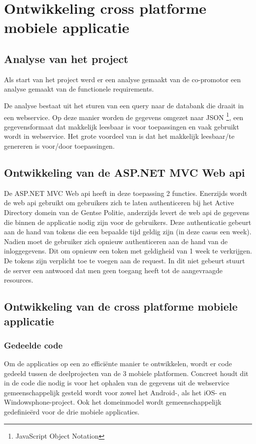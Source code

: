 \chapter{Ontwikkeling cross platforme mobiele applicatie}
\label{ch:ontwikkelingcrossplatformapp}
\section{Analyse van het project}
Als start van het project werd er een analyse gemaakt van de co-promotor
een analyse gemaakt van de functionele requirements.

De analyse bestaat uit het sturen van een query naar de databank die draait in een webservice.
Op deze manier worden de gegevens omgezet naar JSON \footnote{JavaScript Object Notation}, een gegevensformaat dat makkelijk
leesbaar is voor toepassingen en vaak gebruikt wordt in webservice.  Het grote voordeel van \cite{inleidingtotjson}
is dat het makkelijk leesbaar/te genereren is voor/door toepassingen.

\section{Ontwikkeling van de ASP.NET MVC Web api}
De ASP.NET MVC Web api heeft in deze toepassing 2 functies. Enerzijds wordt de web api gebruikt om gebruikers zich te laten
authenticeren bij het Active Directory domein van de Gentse Politie, anderzijds levert de web api de gegevens die binnen
de applicatie nodig zijn voor de gebruikers. Deze authenticatie gebeurt aan de hand van tokens die een bepaalde tijd geldig zijn
(in deze casus een week). Nadien moet de gebruiker zich opnieuw authenticeren aan de hand van de inloggegevens. Dit om opnieuw een
token met geldigheid van 1 week te verkrijgen. De tokens zijn verplicht toe te voegen aan de request. In dit niet gebeurt stuurt
de server een antwoord dat men geen toegang heeft tot de aangevraagde resources.

\section{Ontwikkeling van de cross platforme mobiele applicatie}
\subsection{Gedeelde code}
Om de applicaties op een zo efficiënte manier te ontwikkelen, wordt er code gedeeld tussen de deelprojecten van de 3 mobiele
platformen. Concreet houdt dit in de code die nodig is voor het ophalen van de gegevens uit de webservice gemeenschappelijk
gesteld wordt voor zowel het Android-, als het iOS- en Windowsphone-project. Ook het domeinmodel wordt gemeenschappelijk
gedefinieërd voor de drie mobiele applicaties.

